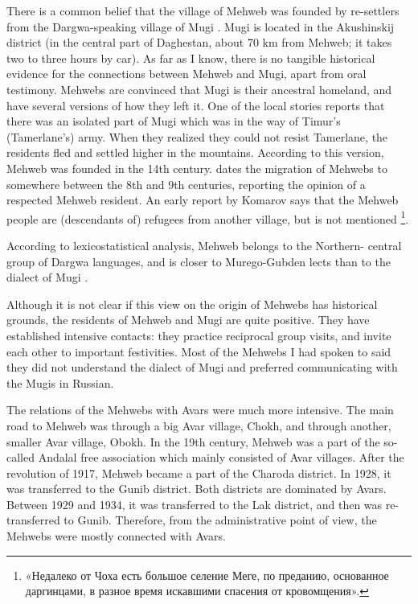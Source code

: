 \documentclass[output=paper]{langsci/langscibook}
\begin{document}
There is a common belief that the village of Mehweb was founded by
re-settlers from the Dargwa-speaking village of Mugi \citep{uslar1892}. Mugi
is located in the Akushinskij district (in the central part of Daghestan, about 70 km from Mehweb; it takes two to three hours by car).
As far as I know, there is no tangible historical evidence for the
connections between Mehweb and Mugi, apart from oral testimony. Mehwebs
are convinced that Mugi is their ancestral homeland, and have several
versions of how they left it. One of the local stories reports that
there was an isolated part of Mugi which was in the way of Timur's
(Tamerlane's) army. When they realized they could not resist
Tamerlane, the residents fled and settled higher in the mountains.
According to this version, Mehweb was founded in the 14th century.
\citet[101]{khajdakov1985} dates the migration of Mehwebs to somewhere between the 8th and 
9th centuries, reporting the opinion of a respected Mehweb resident.
An early report by Komarov says that the Mehweb people are (descendants of)
refugees from another village, but  is not mentioned
\citep{komarov1868}\footnote{\textrussian{«Недалеко от Чоха есть большое селение Меге, по преданию,
  основанное даргинцами, в разное время искавшими спасения от
  кровомщения».}}.

According to lexicostatistical analysis, Mehweb belongs to the
Northern-\hskip0pt central group of Dargwa languages, and is closer to
Murego-Gubden lects than to the dialect of Mugi \citep{koryakov2013}.

Although it is not clear if this view on the origin of Mehwebs has
historical grounds, the residents of Mehweb and Mugi are quite positive.
They have established intensive contacts: they practice reciprocal group
visits, and invite each other to important festivities. Most of the
Mehwebs I had spoken to said they did not understand the dialect of Mugi
and preferred communicating with the Mugis in Russian.

The relations of the Mehwebs with Avars were much more intensive. The
main road to Mehweb was through a big Avar village, Chokh, and through
another, smaller Avar village, Obokh. In the 19th century, Mehweb was a
part of the so-called Andalal free association which mainly consisted of
Avar villages. After the revolution of 1917, Mehweb became a part of the
Charoda district. In 1928, it was transferred to the Gunib district.
Both districts are dominated by Avars. Between 1929 and 1934, it was
transferred to the Lak district, and then was re-transferred to Gunib.
Therefore, from the administrative point of view, the
Mehwebs were mostly connected with Avars.
\end{document}
